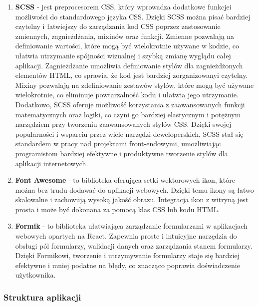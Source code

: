 \begin{enumerate}
    \item {\bf SCSS} - jest preprocesorem CSS, który wprowadza dodatkowe funkcje\linebreak i możliwości do standardowego języka CSS. Dzięki SCSS można pisać bardziej czytelny i łatwiejszy do zarządzania kod CSS poprzez zastosowanie zmiennych, zagnieżdżania, mixinów oraz funkcji. Zmienne pozwalają na definiowanie wartości, które mogą być wielokrotnie używane w kodzie, co ułatwia utrzymanie spójności wizualnej i szybką zmianę wyglądu całej aplikacji. Zagnieżdżanie umożliwia definiowanie stylów dla zagnieżdżonych elementów HTML, co sprawia, że kod jest bardziej zorganizowany\linebreak i czytelny. Mixiny pozwalają na zdefiniowanie zestawów stylów, które mogą być używane wielokrotnie, co eliminuje powtarzalność kodu i ułatwia jego utrzymanie. Dodatkowo, SCSS oferuje możliwość korzystania z zaawansowanych funkcji matematycznych oraz logiki, co czyni go bardziej elastycznym i potężnym narzędziem przy tworzeniu zaawansowanych stylów CSS. Dzięki swojej popularności i wsparciu przez wiele narzędzi deweloperskich, SCSS stał się standardem w pracy nad projektami front-endowymi, umożliwiając programistom bardziej efektywne i produktywne tworzenie stylów dla aplikacji internetowych.
    
    \item {\bf Font Awesome} - to biblioteka oferująca setki wektorowych ikon, które można bez trudu dodawać do aplikacji webowych. Dzięki temu ikony są łatwo skalowalne i zachowują wysoką jakość obrazu. Integracja ikon \linebreak z witryną jest prosta i może być dokonana za pomocą klas CSS lub kodu HTML.
    
    \item {\bf Formik} - to biblioteka ułatwiająca zarządzanie formularzami w aplikacjach webowych opartych na React. Zapewnia proste i intuicyjne narzędzia do obsługi pól formularzy, walidacji danych oraz zarządzania stanem formularzy. Dzięki Formikowi, tworzenie i utrzymywanie formularzy staje się bardziej efektywne i mniej podatne na błędy, co znacząco poprawia doświadczenie użytkownika.

\end{enumerate}

\subsubsection{Struktura aplikacji}


